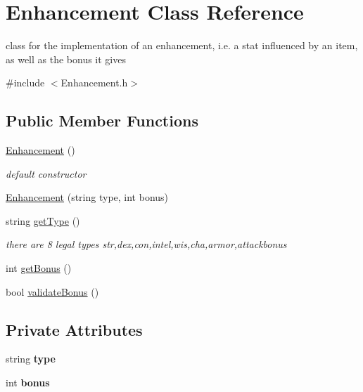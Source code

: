 \hypertarget{class_enhancement}{}\section{Enhancement Class Reference}
\label{class_enhancement}


class for the implementation of an enhancement, i.\+e. a stat influenced by an item, as well as the bonus it gives  




{\ttfamily \#include $<$Enhancement.\+h$>$}

\subsection*{Public Member Functions}
\begin{DoxyCompactItemize}
\item 
\hypertarget{class_enhancement_ab348c08841ab57c76daa7c3eab2ad4a3}{}\label{class_enhancement_ab348c08841ab57c76daa7c3eab2ad4a3} 
\hyperlink{class_enhancement_ab348c08841ab57c76daa7c3eab2ad4a3}{Enhancement} ()
\begin{DoxyCompactList}\small\item\em default constructor \end{DoxyCompactList}\item 
\hyperlink{class_enhancement_a808475a07d34038bdccd59e69d8ad2df}{Enhancement} (string type, int bonus)
\item 
string \hyperlink{class_enhancement_abcdde9da0542f751301f4ddf1809a1cc}{get\+Type} ()
\begin{DoxyCompactList}\small\item\em there are 8 legal types str,dex,con,intel,wis,cha,armor,attackbonus \end{DoxyCompactList}\item 
int \hyperlink{class_enhancement_afd0ea7d414468cf507a4673fd066fd89}{get\+Bonus} ()
\item 
bool \hyperlink{class_enhancement_a00877c4e776f45566020b3129bcaf477}{validate\+Bonus} ()
\end{DoxyCompactItemize}
\subsection*{Private Attributes}
\begin{DoxyCompactItemize}
\item 
\hypertarget{class_enhancement_ae248b59bfb201dfb99abea76790c4b11}{}\label{class_enhancement_ae248b59bfb201dfb99abea76790c4b11} 
string {\bfseries type}
\item 
\hypertarget{class_enhancement_a31a10f94ea3ff92e0c0d9e27635fc775}{}\label{class_enhancement_a31a10f94ea3ff92e0c0d9e27635fc775} 
int {\bfseries bonus}
\end{DoxyCompactItemize}


